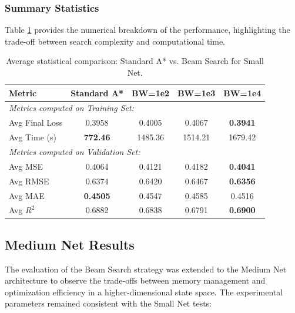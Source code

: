 \subsubsection{Summary Statistics}

Table \ref{tab:small_net_bs_results} provides the numerical breakdown of the performance, highlighting the trade-off between search complexity and computational time.

\begin{table}[h]
\centering
\scriptsize
\begin{tabular}{|l|c|c|c|c|}
\hline
\textbf{Metric} & \textbf{Standard A*} & \textbf{BW=1e2} & \textbf{BW=1e3} & \textbf{BW=1e4} \\ \hline
\multicolumn{5}{|l|}{\textit{Metrics computed on Training Set:}} \\ \hline
Avg Final Loss        & 0.3958               & 0.4005          & 0.4067          & \textbf{0.3941}          \\ \hline
Avg Time (s)          & \textbf{772.46}               & 1485.36         & 1514.21         & 1679.42         \\ \hline
\multicolumn{5}{|l|}{\textit{Metrics computed on Validation Set:}} \\ \hline
Avg MSE               & 0.4064               & 0.4121          & 0.4182          & \textbf{0.4041}          \\ \hline
Avg RMSE              & 0.6374               & 0.6420          & 0.6467          & \textbf{0.6356}          \\ \hline
Avg MAE               & \textbf{0.4505}               & 0.4547          & 0.4585          & 0.4516          \\ \hline
Avg $R^2$             & 0.6882               & 0.6838          & 0.6791          & \textbf{0.6900}          \\ \hline
\end{tabular}
\caption{Average statistical comparison: Standard A* vs. Beam Search for Small Net.}
\label{tab:small_net_bs_results}
\end{table}

\newpage

\subsection{Medium Net Results}

The evaluation of the Beam Search strategy was extended to the Medium Net architecture to observe the trade-offs between memory management and optimization efficiency in a higher-dimensional state space. The experimental parameters remained consistent with the Small Net tests:


